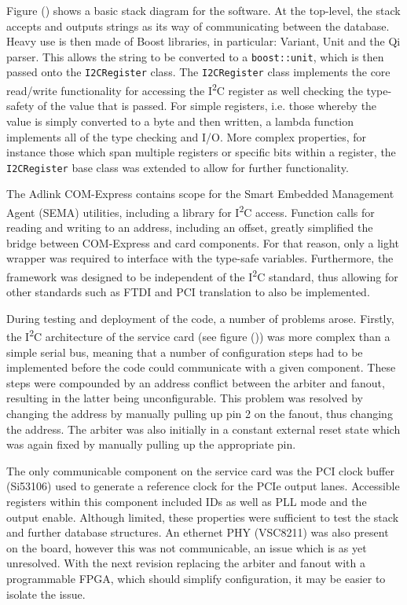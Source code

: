 \documentclass[a4paper,11pt,twocolumn]{article}
\begin{document}
	Figure () shows a basic stack diagram for the software. At the top-level, the stack accepts and outputs strings as its way of communicating between the database. Heavy use is then made of Boost libraries, in particular: Variant, Unit and the Qi parser. This allows the string to be converted to a \verb|boost::unit|, which is then passed onto the \verb|I2CRegister| class. The \verb|I2CRegister| class implements the core read/write functionality for accessing the I\textsuperscript{2}C register as well checking the type-safety of the value that is passed. For simple registers, i.e. those whereby the value is simply converted to a byte and then written, a lambda function implements all of the type checking and I/O. More complex properties, for instance those which span multiple registers or specific bits within a register, the \verb|I2CRegister| base class was extended to allow for further functionality. 
	
	The Adlink COM-Express contains scope for the Smart Embedded Management Agent (SEMA) utilities, including a library for I\textsuperscript{2}C access. Function calls for reading and writing to an address, including an offset, greatly simplified the bridge between COM-Express and card components. For that reason, only a light wrapper was required to interface with the type-safe variables. Furthermore, the framework was designed to be independent of the I\textsuperscript{2}C standard, thus allowing for other standards such as FTDI and PCI translation to also be implemented. 

	During testing and deployment of the code, a number of problems arose. Firstly, the I\textsuperscript{2}C architecture of the service card (see figure ()) was more complex than a simple serial bus, meaning that a number of configuration steps had to be implemented before the code could communicate with a given component. These steps were compounded by an address conflict between the arbiter and fanout, resulting in the latter being unconfigurable. This problem was resolved by changing the address by manually pulling up pin 2 on the fanout, thus changing the address. The arbiter was also initially in a constant external reset state which was again fixed by manually pulling up the appropriate pin. 
	
	The only communicable component on the service card was the PCI clock buffer (Si53106) used to generate a reference clock for the PCIe output lanes. Accessible registers within this component included IDs as well as PLL mode and the output enable. Although limited, these properties were sufficient to test the stack and further database structures. An ethernet PHY (VSC8211) was also present on the board, however this was not communicable, an issue which is as yet unresolved. With the next revision replacing the arbiter and fanout with a programmable FPGA, which should simplify configuration, it may be easier to isolate the issue. 
	
\end{document}
